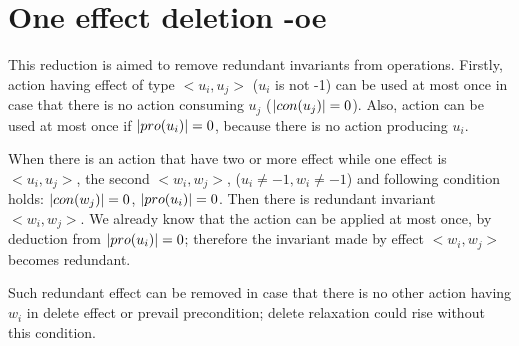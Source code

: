	\chapter{One effect deletion -oe}
	
	This reduction is aimed to remove redundant invariants from operations. Firstly, action having effect of type $<u_i,u_j>$ ($u_i$ is not -1) can be used at most once in case that there is no action consuming $u_j$ ($|con(u_j)| = 0$). Also, action can be used at most once if $|pro(u_i)| = 0$, because there is no action producing $u_i$. 
	
	When there is an action that have two or more effect while one effect is $<u_i,u_j>$, the second $<w_i,w_j>$, ($u_i \neq -1, w_i \neq -1$) and following condition holds: $|con(w_j)| = 0$, $|pro(u_i)| = 0$. Then there is redundant invariant $<w_i,w_j>$. We already know that the action can be applied at most once, by deduction from $|pro(u_i)| = 0$; therefore the invariant made by effect $<w_i,w_j>$ becomes redundant.
	
	Such redundant effect can be removed in case that there is no other action having $w_i$ in delete effect or prevail precondition; delete relaxation could rise without this condition. 
	
